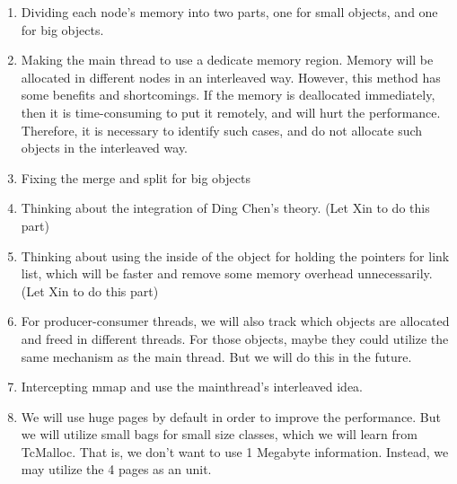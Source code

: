 \begin{enumerate}
\item Dividing each node's memory into two parts, one for small objects, and one for big objects. 
\item Making the main thread to use a dedicate memory region. Memory will be allocated in different nodes in an interleaved way. However, this method has some benefits and shortcomings. If the memory is deallocated immediately, then it is time-consuming to put it remotely, and will hurt the performance. Therefore, it is necessary to identify such cases, and do not allocate such objects in the interleaved way. 
\item Fixing the merge and split for big objects
\item Thinking about the integration of Ding Chen's theory. (Let Xin to do this part)
\item Thinking about using the inside of the object for holding the pointers for link list, which will be faster and remove some memory overhead unnecessarily. (Let Xin to do this part)
\item For producer-consumer threads, we will also track which objects are allocated and freed in different threads. For those objects, maybe they could utilize the same mechanism as the main thread. But we will do this in the future.
\item Intercepting mmap and use the mainthread's interleaved idea. 

\item We will use huge pages by default in order to improve the performance. But we will utilize small bags for small size classes, which we will learn from TcMalloc. That is, we don't want to use 1 Megabyte information. Instead, we may utilize the 4 pages as an unit. 

	
\end{enumerate}

